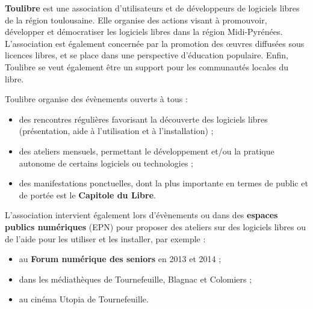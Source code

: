 
\textbf{Toulibre} est une association d'utilisateurs et de développeurs de logiciels libres de la région toulousaine. Elle organise des actions visant à promouvoir, développer et démocratiser les logiciels libres dans la région Midi-Pyrénées. L'association est également concernée par la promotion des œuvres diffusées sous licences libres, et se place dans une perspective d'éducation populaire. Enfin, Toulibre se veut également être un support pour les communautés locales du libre.

\Separateur

Toulibre organise des évènements ouverts à tous :
\begin{itemize}[label=$\bullet$]
\item des rencontres régulières favorisant la découverte des logiciels libres (présentation, aide à l’utilisation et à l’installation) ;
\item des ateliers mensuels, permettant le développement et/ou la 
pratique autonome de certains logiciels ou technologies ;
\item des manifestations ponctuelles, dont la plus importante en termes 
de public et de portée est le \textbf{Capitole du Libre}.
\end{itemize}

L'association intervient également lors d'évènements ou dans des \textbf{espaces publics numériques} (EPN) pour proposer des ateliers sur des logiciels libres ou de l'aide pour les utiliser et les installer, par exemple :
\begin{itemize}[label=$\bullet$]
\item au \textbf{Forum numérique des seniors} en 2013 et 2014 ;
\item dans les médiathèques de Tournefeuille, Blagnac et Colomiers ;
\item au cinéma Utopia de Tournefeuille.
\end{itemize}
